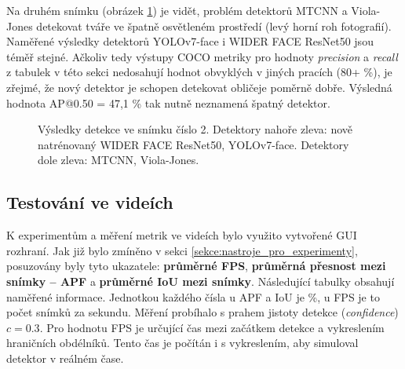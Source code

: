 Na druhém snímku (obrázek \ref{obrazek:test2}) je vidět, problém detektorů MTCNN a Viola-Jones detekovat tváře ve špatně osvětleném prostředí (levý horní roh fotografií). Naměřené výsledky detektorů YOLOv7-face i WIDER FACE ResNet50 jsou téměř stejné. Ačkoliv tedy výstupy COCO metriky pro  hodnoty \emph{precision} a \emph{recall} z tabulek v této sekci nedosahují hodnot obvyklých v jiných pracích (80+ \%), je zřejmé, že nový detektor je schopen detekovat obličeje poměrně dobře. Výsledná hodnota AP@0.50 = 47,1 \% tak nutně neznamená špatný detektor.

\begin{figure}[H] 
  \begin{center}
  \label{obrazek:test2}
  \caption{Výsledky detekce ve snímku číslo 2. Detektory nahoře zleva: nově natrénovaný WIDER FACE ResNet50, YOLOv7-face. Detektory dole zleva: MTCNN, Viola-Jones.}
  \end{center}
\end{figure}

\subsection*{Testování ve videích}
K experimentům a měření metrik ve videích bylo využito vytvořené GUI rozhraní. Jak již bylo zmíněno v sekci \ref{sekce:nastroje_pro_experimenty}, posuzovány byly tyto ukazatele: \textbf{průměrné FPS}, \textbf{průměrná přesnost mezi snímky -- APF} a \textbf{průměrné IoU mezi snímky}. Následující tabulky obsahují naměřené informace. Jednotkou každého čísla u APF a IoU je \%, u FPS je to počet snímků za sekundu. Měření probíhalo s prahem jistoty detekce (\emph{confidence}) $c = 0.3$. Pro hodnotu FPS je určující čas mezi začátkem detekce a vykreslením hraničních obdélníků. Tento čas je počítán i s vykreslením, aby simuloval detektor v reálném čase.


